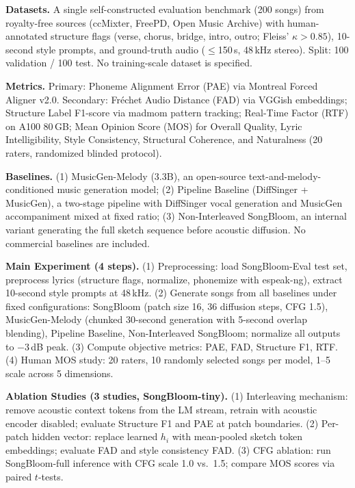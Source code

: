 \begin{tcolorbox}[
	title={Box 15: Case 2 --- Qwen3-Max CoT+Search Output},
	colback=red!3!white,
	colframe=red!30!black,
	colbacktitle=red!15!white,
	coltitle=black,
	fonttitle=\bfseries,
	arc=3mm,
	boxrule=0.8pt,
	breakable
]
\small
\textbf{Datasets.} A single self-constructed evaluation benchmark (200 songs) from royalty-free sources (ccMixter, FreePD, Open Music Archive) with human-annotated structure flags (verse, chorus, bridge, intro, outro; Fleiss' $\kappa>0.85$), 10-second style prompts, and ground-truth audio ($\leq$150\,s, 48\,kHz stereo). Split: 100 validation / 100 test. No training-scale dataset is specified.

\smallskip
\textbf{Metrics.} Primary: Phoneme Alignment Error (PAE) via Montreal Forced Aligner v2.0. Secondary: Fr\'{e}chet Audio Distance (FAD) via VGGish embeddings; Structure Label F1-score via madmom pattern tracking; Real-Time Factor (RTF) on A100 80\,GB; Mean Opinion Score (MOS) for Overall Quality, Lyric Intelligibility, Style Consistency, Structural Coherence, and Naturalness (20 raters, randomized blinded protocol).

\smallskip
\textbf{Baselines.} (1) MusicGen-Melody (3.3B), an open-source text-and-melody-conditioned music generation model; (2) Pipeline Baseline (DiffSinger + MusicGen), a two-stage pipeline with DiffSinger vocal generation and MusicGen accompaniment mixed at fixed ratio; (3) Non-Interleaved SongBloom, an internal variant generating the full sketch sequence before acoustic diffusion. No commercial baselines are included.

\smallskip
\textbf{Main Experiment (4 steps).} (1) Preprocessing: load SongBloom-Eval test set, preprocess lyrics (structure flags, normalize, phonemize with espeak-ng), extract 10-second style prompts at 48\,kHz. (2) Generate songs from all baselines under fixed configurations: SongBloom (patch size 16, 36 diffusion steps, CFG 1.5), MusicGen-Melody (chunked 30-second generation with 5-second overlap blending), Pipeline Baseline, Non-Interleaved SongBloom; normalize all outputs to $-3$\,dB peak. (3) Compute objective metrics: PAE, FAD, Structure F1, RTF. (4) Human MOS study: 20 raters, 10 randomly selected songs per model, 1--5 scale across 5 dimensions.

\smallskip
\textbf{Ablation Studies (3 studies, SongBloom-tiny).} (1) Interleaving mechanism: remove acoustic context tokens from the LM stream, retrain with acoustic encoder disabled; evaluate Structure F1 and PAE at patch boundaries. (2) Per-patch hidden vector: replace learned $h_i$ with mean-pooled sketch token embeddings; evaluate FAD and style consistency FAD. (3) CFG ablation: run SongBloom-full inference with CFG scale 1.0 vs.\ 1.5; compare MOS scores via paired $t$-tests.


\end{tcolorbox}
